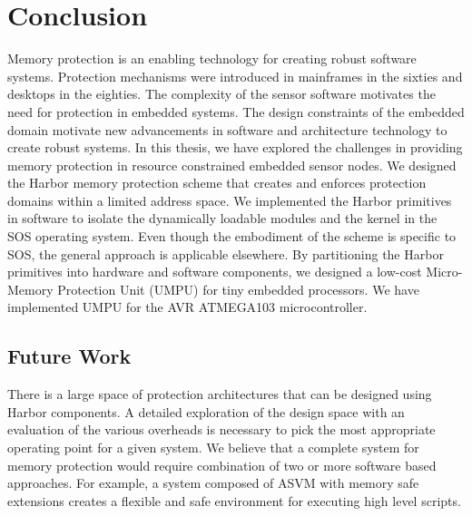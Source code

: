 \section{Conclusion}
\label{sec:conclude}
%
Memory protection is an enabling technology for creating robust
software systems.
%
Protection mechanisms were introduced in mainframes in the sixties and
desktops in the eighties.
%
The complexity of the sensor software motivates the need for
protection in embedded systems.
%
The design constraints of the embedded domain motivate new
advancements in software and architecture technology to create robust
systems.
%
In this thesis, we have explored the challenges in providing memory
protection in resource constrained embedded sensor nodes.
%
We designed the Harbor memory protection scheme that creates and
enforces protection domains within a limited address space.
%
We implemented the Harbor primitives in software to isolate the
dynamically loadable modules and the kernel in the SOS operating
system.
%
Even though the embodiment of the scheme is specific to SOS, the
general approach is applicable elsewhere.
%
By partitioning the Harbor primitives into hardware and software
components, we designed a low-cost Micro-Memory Protection Unit
(UMPU) for tiny embedded processors.
%
We have implemented UMPU for the AVR ATMEGA103 microcontroller.
%

\subsection{Future Work}
\label{sec:verifydesignspace}
%
There is a large space of protection architectures that can be
designed using Harbor components.
%
A detailed exploration of the design space with an evaluation of the
various overheads is necessary to pick the most appropriate operating
point for a given system.
%
We believe that a complete system for memory protection would require
combination of two or more software based approaches.
% 
For example, a system composed of ASVM with memory safe extensions
creates a flexible and safe environment for executing high level
scripts.
%


